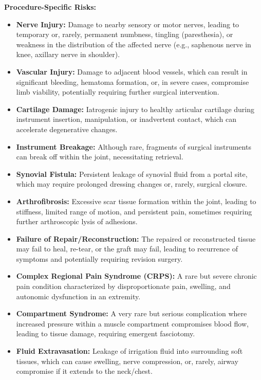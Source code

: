 \textbf{Procedure-Specific Risks:}
\begin{itemize}
  \item \textbf{Nerve Injury:} Damage to nearby sensory or motor nerves, leading to temporary or, rarely, permanent numbness, tingling (paresthesia), or weakness in the distribution of the affected nerve (e.g., saphenous nerve in knee, axillary nerve in shoulder).
  \item \textbf{Vascular Injury:} Damage to adjacent blood vessels, which can result in significant bleeding, hematoma formation, or, in severe cases, compromise limb viability, potentially requiring further surgical intervention.
  \item \textbf{Cartilage Damage:} Iatrogenic injury to healthy articular cartilage during instrument insertion, manipulation, or inadvertent contact, which can accelerate degenerative changes.
  \item \textbf{Instrument Breakage:} Although rare, fragments of surgical instruments can break off within the joint, necessitating retrieval.
  \item \textbf{Synovial Fistula:} Persistent leakage of synovial fluid from a portal site, which may require prolonged dressing changes or, rarely, surgical closure.
  \item \textbf{Arthrofibrosis:} Excessive scar tissue formation within the joint, leading to stiffness, limited range of motion, and persistent pain, sometimes requiring further arthroscopic lysis of adhesions.
  \item \textbf{Failure of Repair/Reconstruction:} The repaired or reconstructed tissue may fail to heal, re-tear, or the graft may fail, leading to recurrence of symptoms and potentially requiring revision surgery.
  \item \textbf{Complex Regional Pain Syndrome (CRPS):} A rare but severe chronic pain condition characterized by disproportionate pain, swelling, and autonomic dysfunction in an extremity.
  \item \textbf{Compartment Syndrome:} A very rare but serious complication where increased pressure within a muscle compartment compromises blood flow, leading to tissue damage, requiring emergent fasciotomy.
  \item \textbf{Fluid Extravasation:} Leakage of irrigation fluid into surrounding soft tissues, which can cause swelling, nerve compression, or, rarely, airway compromise if it extends to the neck/chest.
\end{itemize}

